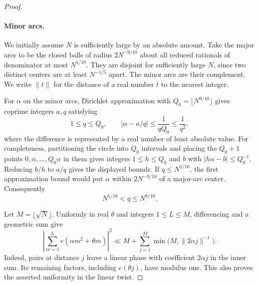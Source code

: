 \begin{proof}
\paragraph{Minor arcs.}
We initially assume $N$ is sufficiently large by an absolute amount.
Take the major arcs to be the closed balls of radius $2N^{-9/10}$
about all reduced rationals of denominator at most $N^{1/10}$.
They are disjoint for sufficiently large $N$, since two distinct
centers are at least $N^{-1/5}$ apart. The minor arcs are their complement.
We write $\|t\|$ for the distance of a real number $t$ to the nearest integer.

For $\alpha$ on the minor arcs, Dirichlet approximation with
$Q_0=\lfloor N^{9/10}\rfloor$ gives coprime integers $a,q$ satisfying
\[
 1\le q\le Q_0,
 \qquad |\alpha-a/q|\le\frac1{qQ_0}\le\frac1{q^2},
\]
where the difference is represented by a real number of least absolute value.
For completeness, partitioning the circle into $Q_0$ intervals and
placing the $Q_0+1$ points $0,\alpha,\ldots,Q_0\alpha$ in them gives
integers $1\le h\le Q_0$ and $b$ with $|h\alpha-b|\le Q_0^{-1}$.
Reducing $b/h$ to $a/q$ gives the displayed bounds.
If $q\le N^{1/10}$, the first approximation bound would put $\alpha$
within $2N^{-9/10}$ of a major-arc center. Consequently
\begin{equation}
 N^{1/10}<q\le N^{9/10}.
 \label{eq:kernel-minor-denominator}
\end{equation}

Let $M=\lfloor\sqrt N\rfloor$. Uniformly in real $\theta$ and
integers $1\le L\le M$, differencing and a geometric sum give
\begin{equation}
 \left|\sum_{m=1}^L e(\alpha m^2+\theta m)\right|^2
 \ll M+\sum_{j=1}^M\min\bigl(M,\|2\alpha j\|^{-1}\bigr).
 \label{eq:kernel-differencing}
\end{equation}
Indeed, pairs at distance $j$ leave a linear phase with coefficient
$2\alpha j$ in the inner sum. Its remaining factors, including
$e(\theta j)$, have modulus one. This also proves the asserted
uniformity in the linear twist.


\end{proof}
